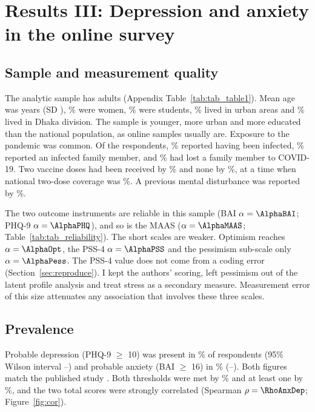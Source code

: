 \chapter{Results III: Depression and anxiety in the online survey}\label{ch:mental}

\section{Sample and measurement quality}
The analytic sample has \MhN{} adults (Appendix Table~\ref{tab:tab_table1}). Mean age was \MhAgeMean{} years (SD \MhAgeSD), \MhFemale\% were women, \MhStudents\% were students, \MhUrban\% lived in urban areas and \MhDhaka\% lived in Dhaka division. The sample is younger, more urban and more educated than the national population, as online samples usually are. Exposure to the pandemic was common. Of the respondents, \MhInfected\% reported having been infected, \MhFamInf\% reported an infected family member, and \MhFamDeath\% had lost a family member to COVID-19. Two vaccine doses had been received by \MhTwoDose\% and none by \MhNoVax\%, at a time when national two-dose coverage was \SurveyVaxEnd\%. A previous mental disturbance was reported by \MhHistYes\%.

The two outcome instruments are reliable in this sample (BAI $\alpha = \AlphaBAI$; PHQ-9 $\alpha = \AlphaPHQ$), and so is the MAAS ($\alpha = \AlphaMAAS$; Table~\ref{tab:tab_reliability}). The short scales are weaker. Optimism reaches $\alpha = \AlphaOpt$, the PSS-4 $\alpha = \AlphaPSS$ and the pessimism sub-scale only $\alpha = \AlphaPess$. The PSS-4 value does not come from a coding error (Section~\ref{sec:reproduce}). I kept the authors' scoring, left pessimism out of the latent profile analysis and treat stress as a secondary measure. Measurement error of this size attenuates any association that involves these three scales.


\section{Prevalence}
Probable depression (PHQ-9 $\geq$ 10) was present in \PrevDep\% of respondents (95\% Wilson interval \PrevDepLo--\PrevDepHi) and probable anxiety (BAI $\geq$ 16) in \PrevAnx\% (\PrevAnxLo--\PrevAnxHi). Both figures match the published study \parencite{islam2023}. Both thresholds were met by \PrevBoth\% and at least one by \PrevEither\%, and the two total scores were strongly correlated (Spearman $\rho = \RhoAnxDep$; Figure~\ref{fig:cor}).

